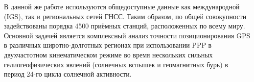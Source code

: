 В данной же работе используются общедоступные данные как международной (IGS), так и региональных сетей ГНСС. 
Таким образом, по общей совокупности задействованы порядка 4500 приёмных станций, расположенных по всему миру. 
Основной задачей является комплексный анализ точности позиционирования GPS в различных широтно-долготных регионах при использовании PPP в двухчастотном кинематическом режиме во время нескольких сильных гелиогеофизических явлений (солнечных вспышек \cite{Yasyukevich2018} и геомагнитных бурь) в период 24-го цикла солнечной активности. 